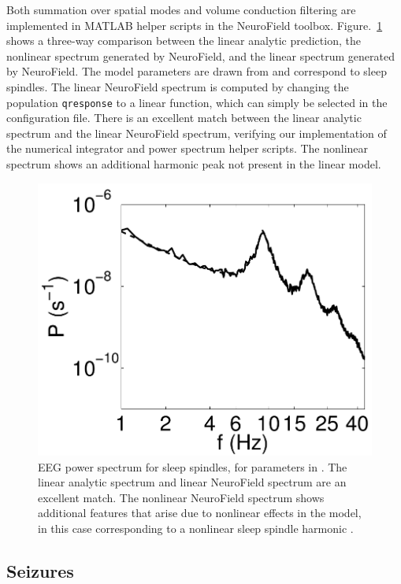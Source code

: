 \documentclass[preprint,review,10pt,authoryear,letterpaper]{elsarticle}
\begin{document}
Both summation over spatial modes and volume conduction filtering are implemented in MATLAB helper scripts in the NeuroField toolbox. Figure.~\ref{fig:spindle_comparison} shows a three-way comparison between the linear analytic prediction, the nonlinear spectrum generated by NeuroField, and the linear spectrum generated by NeuroField. The model parameters are drawn from \citet{Abeysuriya2013} and correspond to sleep spindles. The linear NeuroField spectrum is computed by changing the population \texttt{qresponse} to a linear function, which can simply be selected in the configuration file. There is an excellent match between the linear analytic spectrum and the linear NeuroField spectrum, verifying our implementation of the numerical integrator and power spectrum helper scripts. The nonlinear spectrum shows an additional harmonic peak not present in the linear model. 

\begin{figure}[!htbp]
\begin{center}
\includegraphics[width=0.85\columnwidth]{corticothalamic_comparison}
\caption{EEG power spectrum for sleep spindles, for parameters in \citet{Abeysuriya2013}. The linear analytic spectrum and linear NeuroField spectrum are an excellent match. The nonlinear NeuroField spectrum shows additional features that arise due to nonlinear effects in the model, in this case corresponding to a nonlinear sleep spindle harmonic \citep{Abeysuriya2013a}.}
\label{fig:spindle_comparison}
\end{center}
\end{figure}

\subsection{Seizures}
\label{sec:seizures}
\end{document}
